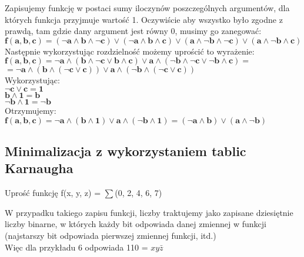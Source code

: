 \documentclass[main.tex]{subfiles}
\begin{document}
    \noindent Zapisujemy funkcję w postaci sumy iloczynów poszczególnych argumentów, dla których funkcja przyjmuje wartość 1.
    Oczywiście aby wszystko było zgodne z prawdą, tam gdzie dany argument jest równy 0, musimy go zanegować: \\

    \noindent $\mathbf{f(a, b, c) = (\neg a \wedge b \wedge \neg c) \vee (\neg a \wedge b \wedge c) \vee (a \wedge \neg b \wedge \neg c) \vee (a \wedge \neg b \wedge c)}$ \\

    \noindent Następnie wykorzystując rozdzielność możemy uprościć to wyrażenie: \\

    \noindent $\mathbf{f(a, b, c) = \neg a \wedge (b \wedge \neg c \vee b \wedge c) \vee a \wedge ( \neg b \wedge \neg c \vee \neg b \wedge c) =}$ \\
    \noindent $\mathbf{= \neg a \wedge (b \wedge ( \neg c \vee c)) \vee a \wedge ( \neg b \wedge ( \neg c \vee c))}$ \\

    \noindent Wykorzystując: \\

    \noindent $\mathbf{\neg c \vee c = 1}$ \\
    \noindent $\mathbf{b \wedge 1 = b}$ \\
    \noindent $\mathbf{\neg b \wedge 1 = \neg b}$ \\

    \noindent Otrzymujemy: \\

    \noindent $\mathbf{f(a, b, c) = \neg a \wedge (b \wedge 1) \vee a \wedge ( \neg b \wedge 1) = (\neg a \wedge b) \vee (a \wedge \neg b)}$

    \newpage

    \subsection{Minimalizacja z wykorzystaniem tablic Karnaugha}
    \begin{exercise}
        Uprość funkcję f(x, y, z) = $\sum$(0, 2, 4, 6, 7)
    \end{exercise}

    \noindent W przypadku takiego zapisu funkcji, liczby traktujemy jako zapisane dziesiętnie liczby binarne, w których każdy bit odpowiada danej zmiennej w funkcji
    (najstarszy bit odpowiada pierwszej zmiennej funkcji, itd.) \\
    \noindent Więc dla przykładu 6 odpowiada 110 = $xy\bar{z}$ \\
\end{document}
